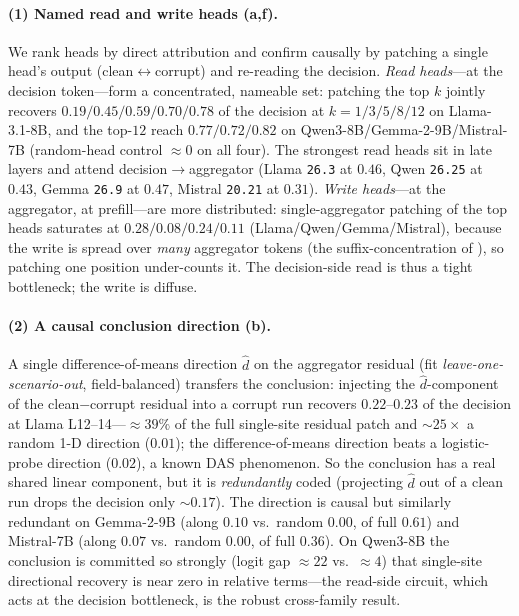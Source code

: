 \paragraph{(1) Named read and write heads (a,f).} We rank heads by direct attribution
and confirm causally by patching a single head's output (clean$\leftrightarrow$corrupt) and re-reading the
decision. \emph{Read heads}---at the decision token---form a concentrated, nameable set: patching the top
$k$ jointly recovers $0.19/0.45/0.59/0.70/0.78$ of the decision at $k{=}1/3/5/8/12$ on Llama-3.1-8B, and
the top-$12$ reach $0.77/0.72/0.82$ on Qwen3-8B/Gemma-2-9B/Mistral-7B (random-head control $\approx 0$ on all
four). The strongest read heads sit in late layers and attend decision$\to$aggregator (Llama \texttt{26.3} at
$0.46$, Qwen \texttt{26.25} at $0.43$, Gemma \texttt{26.9} at $0.47$, Mistral \texttt{20.21} at $0.31$).
\emph{Write heads}---at the aggregator, at prefill---are more distributed: single-aggregator patching of the
top heads saturates at $0.28/0.08/0.24/0.11$ (Llama/Qwen/Gemma/Mistral), because the write is spread over
\emph{many} aggregator tokens (the suffix-concentration of ), so patching one position
under-counts it. The decision-side read is thus a tight bottleneck; the write is diffuse.

\paragraph{(2) A causal conclusion direction (b).} A single difference-of-means direction
$\hat d$ on the aggregator residual (fit \emph{leave-one-scenario-out}, field-balanced) transfers the
conclusion: injecting the $\hat d$-component of the clean$-$corrupt residual into a corrupt run recovers
$0.22$--$0.23$ of the decision at Llama L12--14---$\approx 39\%$ of the full single-site residual patch and
${\sim}25{\times}$ a random 1-D direction ($0.01$); the difference-of-means direction beats a logistic-probe
direction ($0.02$), a known DAS phenomenon. So the conclusion has a real shared linear component, but it is
\emph{redundantly} coded (projecting $\hat d$ out of a clean run drops the decision only ${\sim}0.17$). The
direction is causal but similarly redundant on Gemma-2-9B (along $0.10$ vs.\ random $0.00$, of full $0.61$)
and Mistral-7B (along $0.07$ vs.\ random $0.00$, of full $0.36$). On Qwen3-8B the conclusion is committed so
strongly (logit gap ${\approx}22$ vs.\ ${\approx}4$) that single-site directional recovery is near zero in
relative terms---the read-side circuit, which acts at the decision bottleneck, is the robust cross-family
result.

